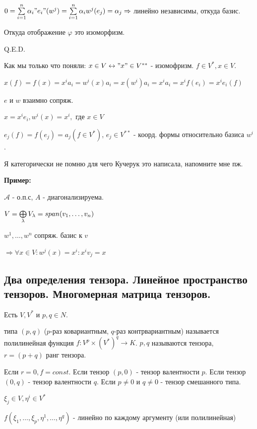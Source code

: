 $0= \sum\limits_{i=1}^n \alpha_i "e_i"(w^j)=\sum\limits_{i=1}^n\alpha_i w^j(e_j) = \alpha_j \Rightarrow$ линейно независимы, откуда базис.

Откуда отображение $\varphi$ это изоморфизм.

\hfill Q.E.D.

Как мы только что поняли: $x \in V \leftrightarrow "x" \in V^{**}$ - изомофризм. $f\in V^{*}, x \in V$.

$x(f)= f(x) = x^i a_i = w^i(x) a_i = x(w^i)a_i =x^ia_i=x^i f(e_i)=x^ie_i(f)$

$e \text{ и }w$ взаимно сопряж.

$x=x^ie_i, w^i(x)=x^i,$ где $x \in V$

$e_j(f)=f(e_j)=a_j(f \in V^*)$, $e_j \in V^{**}$ - коорд. формы относительно базиса $w^i$.

Я категорически не помню для чего Кучерук это написала, напомните мне пж.





\textbf{Пример:}

$\mathcal{A}$ - о.п.с, $A$ - диагонализируема.

$V = \bigoplus\limits_{\lambda}V_{\lambda} = span (v_1,\ldots,v_n)$

$w^1,\ldots,w^n$ сопряж. базис к $v$  %

$\Rightarrow \forall x \in V: w^j(x) =x^i: x^iv_j = x$ 

\newpage
\subsection{Два определения тензора. Линейное пространство тензоров. Многомерная матрица тензоров.}

 Есть $V,V^*$ и $p,q \in N$.

 типа $(p,q)$ ($p$-раз ковариантным, $q$-раз контрвариантным) называется полилинейная функция $f: V^p\times (V^*)^q \rightarrow K$. $p,q$ называются  тензора, $r = (p+q)$ ранг тензора.

Если $r = 0, f = const$. Если тензор $(p,0) $ -  тензор валентности $p$. Если тензор $(0,q)$ -  тензор валентности $q$. Если $p\neq 0 $ и $q\neq 0$ - тензор смешанного типа.

$\xi_j \in V, \eta^i \in V^*$

$f(\xi_1,\ldots,\xi_p,\eta^1,\ldots, \eta^q)$ - линейно по каждому аргументу (или полилинейная)

